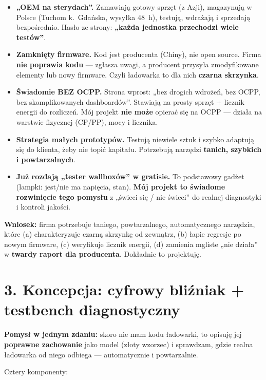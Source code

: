 \documentclass[11pt]{article}
\newcommand{\key}[1]{\textbf{\color{navy}#1}}
\begin{document}
\begin{itemize}
  \item \key{„OEM na sterydach''.} Zamawiają gotowy sprzęt (z Azji), magazynują w Polsce (Tuchom k.\ Gdańska, wysyłka 48~h), testują, wdrażają i sprzedają bezpośrednio. Hasło ze strony: \key{„każda jednostka przechodzi wiele testów''}.
  \item \key{Zamknięty firmware.} Kod jest producenta (Chiny), nie open source. Firma \key{nie poprawia kodu} --- zgłasza uwagi, a producent przysyła zmodyfikowane elementy lub nowy firmware. Czyli ładowarka to dla nich \key{czarna skrzynka}.
  \item \key{Świadomie BEZ OCPP.} Strona wprost: „bez drogich wdrożeń, bez OCPP, bez skomplikowanych dashboardów''. Stawiają na prosty sprzęt + licznik energii do rozliczeń. Mój projekt \key{nie może} opierać się na OCPP --- działa na warstwie fizycznej (CP/PP), mocy i licznika.
  \item \key{Strategia małych prototypów.} Testują niewiele sztuk i szybko adaptują się do klienta, żeby nie topić kapitału. Potrzebują narzędzi \key{tanich, szybkich i powtarzalnych}.
  \item \key{Już rozdają „tester wallboxów'' w gratisie.} To podstawowy gadżet (lampki: jest/nie ma napięcia, stan). \key{Mój projekt to świadome rozwinięcie tego pomysłu} z „świeci się / nie świeci'' do realnej diagnostyki i kontroli jakości.
\end{itemize}

\key{Wniosek:} firma potrzebuje taniego, powtarzalnego, automatycznego narzędzia, które (a) charakteryzuje czarną skrzynkę od zewnątrz, (b) łapie regresje po nowym firmware, (c) weryfikuje licznik energii, (d) zamienia mgliste „nie działa'' w \key{twardy raport dla producenta}. Dokładnie to projektuję.

\section{3. Koncepcja: cyfrowy bliźniak + testbench diagnostyczny}

\key{Pomysł w jednym zdaniu:} skoro nie mam kodu ładowarki, to opisuję jej \key{poprawne zachowanie} jako model (złoty wzorzec) i sprawdzam, gdzie realna ładowarka od niego odbiega --- automatycznie i powtarzalnie.

Cztery komponenty:
\end{document}
